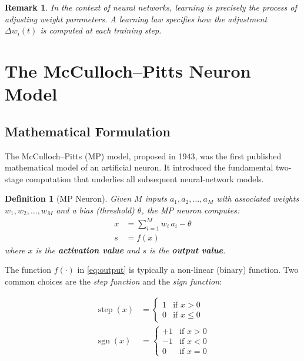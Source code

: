 \documentclass[12pt,a4paper]{article}
\newtheorem{definition}{Definition}[section]
\newtheorem{remark}{Remark}[section]
\newcommand{\sgn}{\operatorname{sgn}}
\newcommand{\step}{\operatorname{step}}
\begin{document}
\begin{remark}
\label{rem:learning-concept}
In the context of neural networks, \emph{learning} is precisely the
process of adjusting weight parameters.
A learning law specifies \emph{how} the adjustment $\Delta w_i(t)$
is computed at each training step.
\end{remark}

\section{The McCulloch--Pitts Neuron Model}
\label{sec:mp-model}

\subsection{Mathematical Formulation}
\label{subsec:mp-math}

The McCulloch--Pitts (MP) model, proposed in 1943, was the first
published mathematical model of an artificial neuron.
It introduced the fundamental two-stage computation that underlies
all subsequent neural-network models.

\begin{definition}[MP Neuron]
\label{def:mp-neuron}
Given $M$ inputs $a_1, a_2, \ldots, a_M$ with associated weights
$w_1, w_2, \ldots, w_M$ and a bias (threshold) $\theta$, the MP neuron
computes:
\begin{align}
  x &= \sum_{i=1}^{M} w_i\, a_i - \theta \label{eq:activation}\\
  s &= f(x) \label{eq:output}
\end{align}
where $x$ is the \textbf{activation value} and $s$ is the \textbf{output value}.
\end{definition}

The function $f(\cdot)$ in \cref{eq:output} is typically a non-linear
(binary) function.
Two common choices are the \emph{step function} and the \emph{sign function}:

\begin{align}
  \step(x) &= \begin{cases} 1 & \text{if } x > 0 \\ 0 & \text{if } x \leq 0 \end{cases}
  \label{eq:step}\\[6pt]
  \sgn(x)  &= \begin{cases} +1 & \text{if } x > 0 \\ -1 & \text{if } x < 0 \\ 0 & \text{if } x = 0 \end{cases}
  \label{eq:sign}
\end{align}
\end{document}
